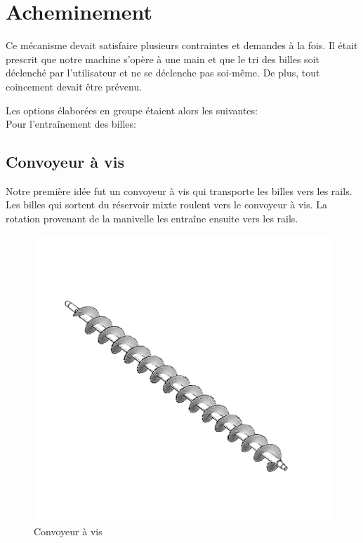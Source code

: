 \section{Acheminement}
Ce mécanisme devait satisfaire plusieurs contraintes et demandes à la fois. Il était prescrit que notre machine s'opère à une main et que le tri des billes soit déclenché par l'utilisateur et ne se déclenche pas soi-même. De plus, tout coincement devait être prévenu.

Les options élaborées en groupe étaient alors les suivantes:\\
Pour l'entraînement des billes:

\subsection{Convoyeur à vis}
Notre première idée fut un convoyeur à vis qui transporte les billes vers les rails. Les billes qui sortent du réservoir mixte roulent vers le convoyeur à vis. La rotation provenant de la manivelle les entraîne ensuite vers les rails.

\begin{figure}
    \centering
    \includegraphics[width=\textwidth]{Graphics/Images_concepts_Leon/795-Screw_conveyor_Kopie.png}
    \caption{Convoyeur à vis}
\end{figure}

